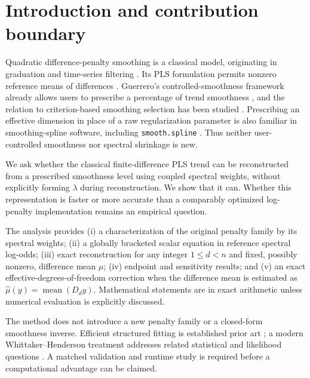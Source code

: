 \section{Introduction and contribution boundary}\label{sec:intro}

Quadratic difference-penalty smoothing is a classical model, originating in graduation and time-series filtering \citep{whittaker1923}. Its PLS formulation permits nonzero reference means of differences \citep{guerrero2007}. Guerrero's controlled-smoothness framework already allows users to prescribe a percentage of trend smoothness \citep{guerrero2008}, and the relation to criterion-based smoothing selection has been studied \citep{cortes2017}. Prescribing an effective dimension in place of a raw regularization parameter is also familiar in smoothing-spline software, including \texttt{smooth.spline} \citep{rsmoothspline}. Thus neither user-controlled smoothness nor spectral shrinkage is new.

We ask whether the classical finite-difference PLS trend can be reconstructed from a prescribed smoothness level using coupled spectral weights, without explicitly forming $\lambda$ during reconstruction. We show that it can. Whether this representation is faster or more accurate than a comparably optimized log-penalty implementation remains an empirical question.

The analysis provides (i) a characterization of the original penalty family by its spectral weights; (ii) a globally bracketed scalar equation in reference spectral log-odds; (iii) exact reconstruction for any integer $1\le d<n$ and fixed, possibly nonzero, difference mean $\mu$; (iv) endpoint and sensitivity results; and (v) an exact effective-degrees-of-freedom correction when the difference mean is estimated as $\widehat\mu(y)=\operatorname{mean}(D_dy)$. Mathematical statements are in exact arithmetic unless numerical evaluation is explicitly discussed.

The method does not introduce a new penalty family or a closed-form smoothness inverse. Efficient structured fitting is established prior art \citep{weinert2007}; a modern Whittaker--Henderson treatment addresses related statistical and likelihood questions \citep{biessy2026}. A matched validation and runtime study is required before a computational advantage can be claimed.

